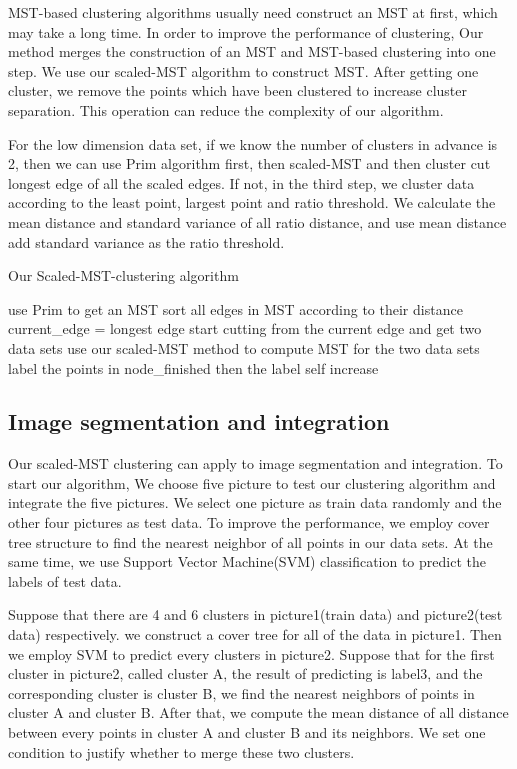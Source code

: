 	  MST-based clustering algorithms usually need construct an MST at first, which may take a long time. In order to improve the performance of clustering, Our method merges the construction of an MST and MST-based clustering into one step. We use our scaled-MST algorithm to construct MST. After getting one cluster, we remove the points which have been clustered to increase cluster separation. This operation can reduce the complexity of our algorithm. 

	  For the low dimension data set, if we know the number of clusters in advance is 2, then we can use Prim algorithm first, then scaled-MST and then cluster cut longest edge of all the scaled edges. If not, in the third step, we cluster data according to the least point, largest point and ratio threshold. We calculate the mean distance and standard variance of all ratio distance, and use mean distance add standard variance as the ratio threshold. 
		\begin{algorithm}  
	      \caption{Our Scaled-MST-clustering algorithm}  
	      use Prim to get an MST\;
	      sort all edges in MST according to their distance\;
	      current\_edge = longest edge\;
	      start cutting from the current edge and get two data sets\;
	      use our scaled-MST method to compute MST for the two data sets\;
	      label the points in node\_finished\;
	      then the label self increase\; 
	    \end{algorithm}  
	\subsection{Image segmentation and integration}
		Our scaled-MST clustering can apply to image segmentation and integration. To start our algorithm, We choose five picture to test our clustering algorithm and integrate the five pictures. We select one picture as train data randomly and the other four pictures as test data. To improve the performance, we employ cover tree structure to find the nearest neighbor of all points in our data sets. At the same time, we use Support Vector Machine(SVM) classification to predict the labels of test data. 

		Suppose that there are 4 and 6 clusters in picture1(train data) and picture2(test data) respectively. we construct a cover tree for all of the data in picture1. Then we employ SVM to predict every clusters in picture2. Suppose that for the first cluster in picture2, called cluster A, the result of predicting is label3, and the corresponding cluster is cluster B, we find the nearest neighbors of points in cluster A and cluster B. After that, we compute the mean distance of all distance between every points in cluster A and cluster B and its neighbors. We set one condition to justify whether to merge these two clusters.

